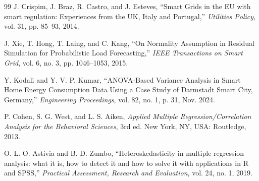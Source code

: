 \documentclass[conference]{IEEEtran}
\begin{document}
\begin{thebibliography}{99}
 J. Crispim, J. Braz, R. Castro, and J. Esteves, ``Smart Grids in the EU with smart regulation: Experiences from the UK, Italy and Portugal,'' \textit{Utilities Policy}, vol. 31, pp. 85--93, 2014.

 J. Xie, T. Hong, T. Laing, and C. Kang, ``On Normality Assumption in Residual Simulation for Probabilistic Load Forecasting,'' \textit{IEEE Transactions on Smart Grid}, vol. 6, no. 3, pp. 1046--1053, 2015.

 Y. Kodali and Y. V. P. Kumar, ``ANOVA-Based Variance Analysis in Smart Home Energy Consumption Data Using a Case Study of Darmstadt Smart City, Germany,'' \textit{Engineering Proceedings}, vol. 82, no. 1, p. 31, Nov. 2024.

 P. Cohen, S. G. West, and L. S. Aiken, \textit{Applied Multiple Regression/Correlation Analysis for the Behavioral Sciences}, 3rd ed. New York, NY, USA: Routledge, 2013.

 O. L. O. Astivia and B. D. Zumbo, ``Heteroskedasticity in multiple regression analysis: what it is, how to detect it and how to solve it with applications in R and SPSS,'' \textit{Practical Assessment, Research and Evaluation}, vol. 24, no. 1, 2019.

\end{thebibliography}
\end{document}
